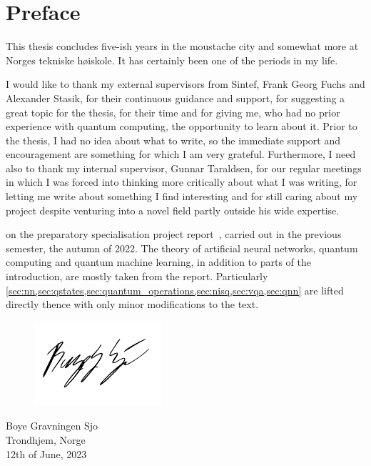 \chapter{Preface}
This thesis concludes five-ish years in the moustache city and somewhat more at Norges tekniske høiskole.
It has certainly been one of the periods in my life.

I would like to thank my external supervisors from Sintef, Frank Georg Fuchs and Alexander Stasik, for their continuous guidance and support, for suggesting a great topic for the thesis, for their time and for giving me, who had no prior experience with quantum computing, the opportunity to learn about it.
Prior to the thesis, I had no idea about what to write, so the immediate support and encouragement are something for which I am very grateful.
Furthermore, I need also to thank my internal supervisor, Gunnar Taraldsen, for our regular meetings in which I was forced into thinking more critically about what I was writing, for letting me write about something I find interesting and for still caring about my project despite venturing into a novel field partly outside his wide expertise.

\makebox[\dimexpr\textwidth-\parindent][s]{Note that this thesis is based}
on the preparatory specialisation project report~\autocite{sjo2022}, carried out in the previous semester, the autumn of 2022.
The theory of artificial neural networks, quantum computing and quantum machine learning, in addition to parts of the introduction, are mostly taken from the report.
Particularly \cref{sec:nn,sec:qstates,sec:quantum_operations,sec:nisq,sec:vqa,sec:qnn} are lifted directly thence with only minor modifications to the text.

\vspace{1.5cm}
\begin{figure}[h]
  \raggedleft
  \includegraphics[width=0.3\linewidth]{blank.pdf}
\end{figure}
\begin{flushright}
  \vspace{-1.3cm}
  Boye Gravningen Sjo \\
  Trondhjem, Norge \\
  12th of June, 2023
\end{flushright}

\cleardoublepage